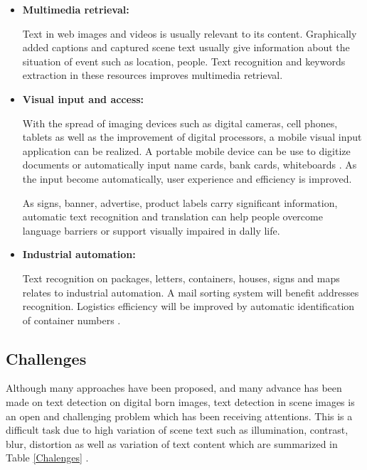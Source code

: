 \begin{itemize}
\item{\textbf{Multimedia retrieval:}}

Text in web images and videos is usually relevant to its content. Graphically added captions and captured scene text usually give information about the situation of event such as location, people. Text recognition and keywords extraction in these resources improves multimedia retrieval. 
\item{\textbf{Visual input and access:}}

With the spread of imaging devices such as digital cameras, cell phones, tablets as well as the improvement of digital processors, a mobile visual input application can be realized. A portable mobile device can be use to digitize documents or automatically input name cards, bank cards, whiteboards \cite{Liang.2005.IJDAR}. As the input become automatically, user experience and efficiency is improved. 

As signs, banner, advertise, product labels carry significant information, automatic text recognition and translation can help people overcome language barriers or support visually impaired in dally life. 

\item{\textbf{Industrial automation:}}

Text recognition on packages, letters, containers, houses, signs and maps relates to industrial automation. A mail sorting system will benefit addresses recognition. Logistics efficiency will be improved by automatic identification of container numbers \cite{He.2005.TITS}.

\end{itemize}

\subsection{Challenges}

Although many approaches have been proposed, and many advance has been made on text detection on digital born images, text detection in scene images is an open and challenging problem which has been receiving attentions. This is a difficult task due to high variation of scene text such as illumination, contrast, blur, distortion as well as variation of text content \cite{Liang.2005.IJDAR} which are summarized in Table \ref{Chalenges} .

